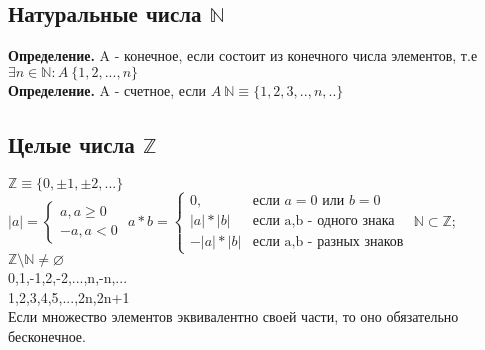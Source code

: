 \documentclass[../main.tex]{subfiles}
\begin{document}
\subsection{Натуральные числа $\mathbb{N}$}
\textbf{Определение.} A - конечное, если состоит из конечного числа элементов, т.е $\exists n\in \mathbb{N}: A~\{1,2,...,n\}$\\
\textbf{Определение.} A - счетное, если $A~\mathbb{N}\equiv\{1,2,3,..,n,..\}$\\
\subsection{Целые числа $\mathbb{Z}$}
$\mathbb{Z}\equiv\{0,\pm 1, \pm 2, ...\}$\\
\begin{math}
    |a| = 
    \begin{cases}
        a, a\geqslant 0\\
        -a, a < 0
    \end{cases}
\end{math}
\begin{math}
    a*b = 
    \begin{cases}
        0,&\text{если $a=0$ или $b=0$}\\
        |a|*|b|&\text{если a,b - одного знака}\\
        -|a|*|b|&\text{если a,b - разных знаков}
    \end{cases}
\end{math}
$\mathbb{N} \subset \mathbb{Z}$; $\mathbb{Z}\setminus\mathbb{N}\neq\varnothing$\\
0,1,-1,2,-2,...,n,-n,...\\
1,2,3,4,5,...,2n,2n+1\\
Если множество элементов эквивалентно своей части, то оно обязательно бесконечное.
\end{document}

